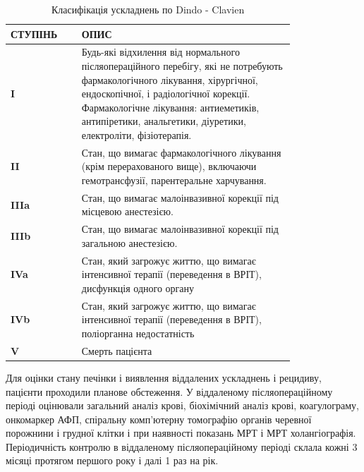 \begin{table}[]
\centering
\caption{Класифікація ускладнень по Dindo - Clavien}
\label{tab:Dindo}
\begin{tabular}{|p{0.2\linewidth}|p{0.6\linewidth}|}
\hline
{\color[HTML]{231F20} \textbf{СТУПІНЬ}} & {\color[HTML]{231F20} \textbf{ОПИС}}                                                                                        \\ \hline
\textbf{I} &
  Будь-які відхилення від нормального післяопераційного перебігу, які не потребують фармакологічного лікування, хірургічної, ендоскопічної, і радіологічної корекції. Фармакологічне лікування: антиеметиків, антипіретики, анальгетики, діуретики, електроліти, фізіотерапія. \\ \hline
\textbf{II}                             & Стан, що вимагає фармакологічного лікування (крім перерахованого вище), включаючи гемотрансфузії, парентеральне харчування. \\ \hline
\textbf{IIIa}                           & Стан, що вимагає малоінвазивної корекції під місцевою анестезією.                                                           \\ \hline
\textbf{IIIb}                           & Стан, що вимагає малоінвазивної корекції під загальною анестезією.                                                          \\ \hline
\textbf{IVa}                            & Стан, який загрожує життю, що вимагає інтенсивної терапії (переведення в ВРІТ), дисфункція одного органу                    \\ \hline
\textbf{IVb}                            & Стан, який загрожує життю, що вимагає інтенсивної терапії (переведення в ВРІТ), поліорганна недостатність                   \\ \hline
\textbf{V}                              & Смерть пацієнта                                                                                                             \\ \hline
\end{tabular}
\end{table}

Для оцінки стану печінки і виявлення віддалених ускладнень і рецидиву, пацієнти проходили планове обстеження. У віддаленому післяопераційному періоді оцінювали загальний аналіз крові, біохімічний аналіз крові, коагулограму, онкомаркер АФП, спіральну комп'ютерну томографію органів черевної порожнини і грудної клітки і при наявності показань МРТ і МРТ холангіографія. Періодичність контролю в віддаленому післяопераційному періоді склала кожні 3 місяці протягом першого року і далі 1 раз на рік.


